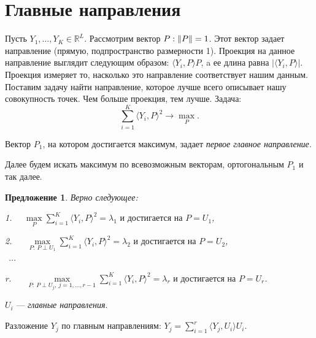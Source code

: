 \documentclass[specialist, 12pt,
subf, %
href, colorlinks=true,
substylefile = spbu.rtx,
]{disser}
\newtheorem{proposition}{Предложение}
\begin{document}
\section{Главные направления}
Пусть $Y_1,\ldots,Y_K\in \mathbb{R}^L$. Рассмотрим вектор $P: \Arrowvert P \Arrowvert =1$. Этот вектор задает направление (прямую, подпространство размерности 1). Проекция на данное направление выглядит следующим образом: $\langle Y_i,P\rangle P$, a ее длина равна $|\langle Y_i,P\rangle|$. Проекция измеряет то, насколько это направление соответствует нашим данным.
Поставим задачу найти направление, которое лучше всего описывает нашу совокупность точек. Чем больше проекция, тем лучше. Задача:
\begin{equation*}
\sum\limits_{i =1}^K \langle Y_i,P\rangle ^2 \to \max\limits_P.
\end{equation*}

Вектор $P_1$, на котором достигается максимум, задает \textit{первое главное направление.}

Далее будем искать максимум по всевозможным векторам, ортогональным $P_1$ и так далее.

\begin{proposition} Верно следующее:
	
	1. ~~$ \max\limits_P \sum\limits_{i =1}^K \langle Y_i,P\rangle ^2 =\lambda_1 \text{ и достигается на } P=U_1$,

	2. ~~ $\max\limits_{P: ~P\perp U_1} \sum\limits_{i =1}^K \langle Y_i,P\rangle ^2 =\lambda_2 \text{ и достигается на } P=U_2$, \\
	
    $~~\ldots~~$
	
	r. ~~ $\max\limits_{P:~ P\perp U_j,~ j=1,\ldots,r-1} \sum\limits_{i =1}^K \langle Y_i,P\rangle ^2 =\lambda_r \text{ и достигается на } P=U_r$.
\end{proposition}

$U_i$ --- \textit{главные направления}.

Разложение $Y_j$ по главным направлениям: $Y_j=\sum\limits_{i =1}^r \langle Y_j,U_i\rangle U_i.$
\end{document}
